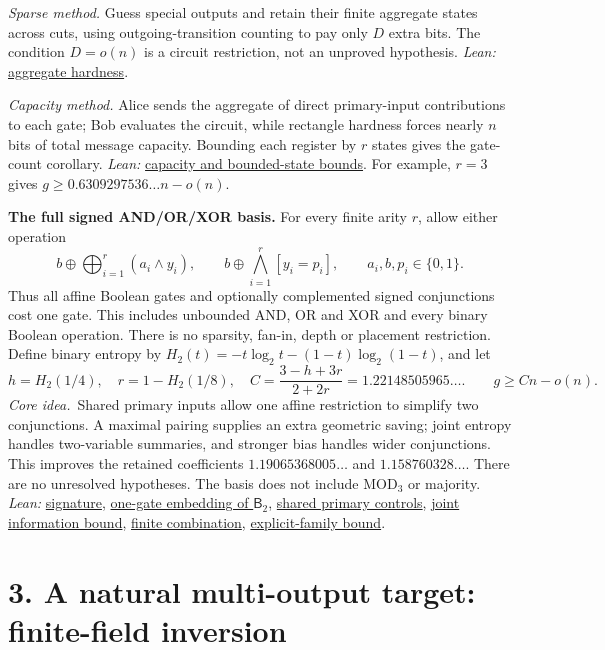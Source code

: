 \documentclass[11pt]{article}
\providecommand{\RepoRoot}{../../}
\newcommand{\repolink}[2]{\href{\RepoRoot#1}{#2}}
\newcommand{\leanlink}[2]{\repolink{Complexitylib/Algebraic/LowerBound/Cutwidth/#1}{#2}}
\newcommand{\method}{\textit{Core idea.}\ }
\newcommand{\Btwo}{\mathsf{B}_2}
\newcommand{\little}[1]{o(#1)}
\begin{document}
\textit{Sparse method.} Guess special outputs and retain their finite aggregate
states across cuts, using outgoing-transition counting to pay only $D$ extra bits.
The condition $D=\little n$ is a circuit restriction, not an unproved hypothesis.
\textit{Lean:} \leanlink{Aggregate/Hardness.lean}{aggregate hardness}.

\textit{Capacity method.} Alice sends the aggregate of direct primary-input
contributions to each gate; Bob evaluates the circuit, while rectangle hardness
forces nearly $n$ bits of total message capacity.
Bounding each register by $r$ states gives the gate-count corollary.
\textit{Lean:} \leanlink{Aggregate/Capacity/Hardness.lean}{capacity and bounded-state bounds}.
For example, $r=3$ gives $g\geq0.6309297536\ldots n-\little n$.

\medskip
\textbf{The full signed AND/OR/XOR basis.}
For every finite arity $r$, allow either operation
\[
 b\oplus\bigoplus_{i=1}^r(a_i\wedge y_i),
 \qquad
 b\oplus\bigwedge_{i=1}^r[y_i=p_i],
 \qquad a_i,b,p_i\in\{0,1\}.
\]
Thus all affine Boolean gates and optionally complemented signed conjunctions
cost one gate. This includes unbounded AND, OR and XOR and every binary Boolean
operation. There is no sparsity, fan-in, depth or placement restriction.
Define binary entropy by $H_2(t)=-t\log_2t-(1-t)\log_2(1-t)$, and let
\[
 h=H_2(1/4),\quad r=1-H_2(1/8),\quad
 C=\frac{3-h+3r}{2+2r}=1.22148505965\ldots.
 \qquad\boxed{g\geq Cn-\little n.}
\]
\method Shared primary inputs allow one affine restriction to simplify two
conjunctions. A maximal pairing supplies an extra geometric saving; joint entropy
handles two-variable summaries, and stronger bias handles wider conjunctions.
This improves the retained coefficients $1.19065368005\ldots$ and
$1.158760328\ldots$. There are no unresolved hypotheses. The basis does not include
MOD$_3$ or majority.
\textit{Lean:}
\leanlink{Aggregate/Geometry/Defs.lean}{signature},
\leanlink{Aggregate/Geometry/Model.lean}{one-gate embedding of $\Btwo$},
\leanlink{Aggregate/Geometry/Affine/Shared.lean}{shared primary controls},
\leanlink{Aggregate/Geometry/Joint/SharedMessage.lean}{joint information bound},
\leanlink{Aggregate/Geometry/Shared/LowerBound.lean}{finite combination},
\leanlink{Aggregate/Geometry/Shared/Hardness.lean}{explicit-family bound}.

\newpage
\section*{3. A natural multi-output target: finite-field inversion}
\end{document}
